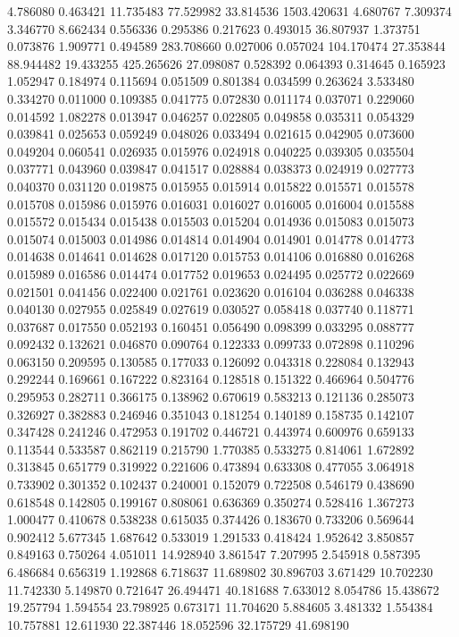 4.786080
0.463421
11.735483
77.529982
33.814536
1503.420631
4.680767
7.309374
3.346770
8.662434
0.556336
0.295386
0.217623
0.493015
36.807937
1.373751
0.073876
1.909771
0.494589
283.708660
0.027006
0.057024
104.170474
27.353844
88.944482
19.433255
425.265626
27.098087
0.528392
0.064393
0.314645
0.165923
1.052947
0.184974
0.115694
0.051509
0.801384
0.034599
0.263624
3.533480
0.334270
0.011000
0.109385
0.041775
0.072830
0.011174
0.037071
0.229060
0.014592
1.082278
0.013947
0.046257
0.022805
0.049858
0.035311
0.054329
0.039841
0.025653
0.059249
0.048026
0.033494
0.021615
0.042905
0.073600
0.049204
0.060541
0.026935
0.015976
0.024918
0.040225
0.039305
0.035504
0.037771
0.043960
0.039847
0.041517
0.028884
0.038373
0.024919
0.027773
0.040370
0.031120
0.019875
0.015955
0.015914
0.015822
0.015571
0.015578
0.015708
0.015986
0.015976
0.016031
0.016027
0.016005
0.016004
0.015588
0.015572
0.015434
0.015438
0.015503
0.015204
0.014936
0.015083
0.015073
0.015074
0.015003
0.014986
0.014814
0.014904
0.014901
0.014778
0.014773
0.014638
0.014641
0.014628
0.017120
0.015753
0.014106
0.016880
0.016268
0.015989
0.016586
0.014474
0.017752
0.019653
0.024495
0.025772
0.022669
0.021501
0.041456
0.022400
0.021761
0.023620
0.016104
0.036288
0.046338
0.040130
0.027955
0.025849
0.027619
0.030527
0.058418
0.037740
0.118771
0.037687
0.017550
0.052193
0.160451
0.056490
0.098399
0.033295
0.088777
0.092432
0.132621
0.046870
0.090764
0.122333
0.099733
0.072898
0.110296
0.063150
0.209595
0.130585
0.177033
0.126092
0.043318
0.228084
0.132943
0.292244
0.169661
0.167222
0.823164
0.128518
0.151322
0.466964
0.504776
0.295953
0.282711
0.366175
0.138962
0.670619
0.583213
0.121136
0.285073
0.326927
0.382883
0.246946
0.351043
0.181254
0.140189
0.158735
0.142107
0.347428
0.241246
0.472953
0.191702
0.446721
0.443974
0.600976
0.659133
0.113544
0.533587
0.862119
0.215790
1.770385
0.533275
0.814061
1.672892
0.313845
0.651779
0.319922
0.221606
0.473894
0.633308
0.477055
3.064918
0.733902
0.301352
0.102437
0.240001
0.152079
0.722508
0.546179
0.438690
0.618548
0.142805
0.199167
0.808061
0.636369
0.350274
0.528416
1.367273
1.000477
0.410678
0.538238
0.615035
0.374426
0.183670
0.733206
0.569644
0.902412
5.677345
1.687642
0.533019
1.291533
0.418424
1.952642
3.850857
0.849163
0.750264
4.051011
14.928940
3.861547
7.207995
2.545918
0.587395
6.486684
0.656319
1.192868
6.718637
11.689802
30.896703
3.671429
10.702230
11.742330
5.149870
0.721647
26.494471
40.181688
7.633012
8.054786
15.438672
19.257794
1.594554
23.798925
0.673171
11.704620
5.884605
3.481332
1.554384
10.757881
12.611930
22.387446
18.052596
32.175729
41.698190
